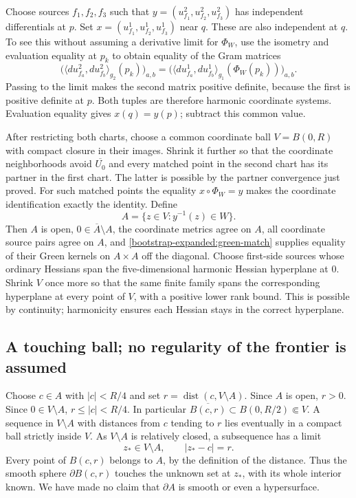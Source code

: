 \documentclass[11pt]{article}
\theoremstyle{definition}
\theoremstyle{remark}
\numberwithin{equation}{section}
\begin{document}
Choose sources $f_1,f_2,f_3$ such that
$y=(u_{f_1}^2,u_{f_2}^2,u_{f_3}^2)$ has independent differentials
at $p$.  Set $x=(u_{f_1}^1,u_{f_2}^1,u_{f_3}^1)$ near $q$.
These are also independent at $q$.  To see this without assuming a
derivative limit for $\Phi_W$, use the isometry and evaluation equality
at $p_k$ to obtain equality of the Gram matrices
\[
 \bigl(\langle du_{f_a}^2,du_{f_b}^2\rangle_{g_2}(p_k)\bigr)_{a,b}
 =\bigl(\langle du_{f_a}^1,du_{f_b}^1\rangle_{g_1}
                                      (\Phi_W(p_k))\bigr)_{a,b}.
\]
Passing to the limit makes the second matrix positive definite,
because the first is positive definite at $p$.  Both tuples are
therefore harmonic coordinate systems.  Evaluation equality gives
$x(q)=y(p)$; subtract this common value.

After restricting both charts, choose a common coordinate ball
$V=B(0,R)$ with compact closure in their images.  Shrink it further
so that the coordinate neighborhoods avoid $\overline{U_0}$ and every
matched point in the second chart has its partner in the first chart.
The latter is possible by the partner convergence just proved.
For such matched points the equality $x\circ\Phi_W=y$ makes the
coordinate identification exactly the identity.  Define
\[
 A=\{z\in V:y^{-1}(z)\in W\}.
\]
Then $A$ is open, $0\in\overline A\setminus A$, the coordinate
metrics agree on $A$, all coordinate source pairs agree on $A$, and
\eqref{bootstrap-expanded:green-match} supplies equality of their Green kernels
on $A\times A$ off the diagonal.  Choose first-side sources whose
ordinary Hessians span the five-dimensional harmonic Hessian
hyperplane at $0$.  Shrink $V$ once more so that the same finite
family spans the corresponding hyperplane at every point of $V$,
with a positive lower rank bound.  This is possible by continuity;
harmonicity ensures each Hessian stays in the correct hyperplane.

\subsection{A touching ball; no regularity of the frontier is assumed}
\label{bootstrap-expanded:touching}

Choose $c\in A$ with $|c|<R/4$ and set
$r=\operatorname{dist}(c,V\setminus A)$.  Since $A$ is open,
$r>0$.  Since $0\in V\setminus A$, $r\leq|c|<R/4$.
In particular $\overline{B(c,r)}\subset B(0,R/2)\Subset V$.
A sequence in $V\setminus A$ with distances from $c$ tending to
$r$ lies eventually in a compact ball strictly inside $V$.
As $V\setminus A$ is relatively closed, a subsequence has a limit
\[
 z_*\in V\setminus A,\qquad |z_*-c|=r.
\]
Every point of $B(c,r)$ belongs to $A$, by the definition of the
distance.  Thus the smooth sphere $\partial B(c,r)$ touches the
unknown set at $z_*$, with its whole interior known.  We have made
no claim that $\partial A$ is smooth or even a hypersurface.
\end{document}
